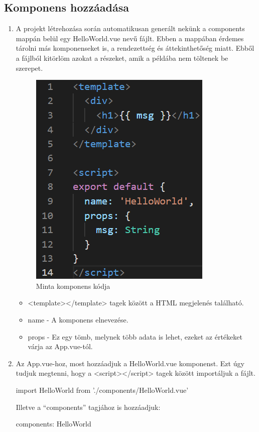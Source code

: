 \subsection{Komponens hozzáadása}
\begin{enumerate}
	\item A projekt létrehozása során automatikusan generált nekünk a components mappán belül egy HelloWorld.vue nevű fájlt. Ebben a mappában érdemes tárolni más komponenseket is, a rendezettség és áttekinthetőség miatt. Ebből a fájlból kitörlöm azokat a részeket, amik a példába nem töltenek be szerepet. 
	\begin{figure}[h!]
	\centering
	\includegraphics[scale=0.25]{images/14dfb7fd47c01c0cd6d8692ca740c349.png}
	\caption{Minta komponens kódja}
	\label{fig:ff}
	\end{figure}
	\begin{itemize}
		\item <template></template> tagek között a HTML megjelenés található.
		\item name - A komponens elnevezése.
		\item props - Ez egy tömb, melynek több adata is lehet, ezeket az értékeket várja az App.vue-tól.
	\end{itemize}
	\item Az App.vue-hoz, most hozzáadjuk a HelloWorld.vue komponenst. Ezt úgy tudjuk megtenni, hogy a <script></script> tagek között importáljuk a fájlt.
	\begin{javascript}
import HelloWorld from './components/HelloWorld.vue'
\end{javascript}
	Illetve a “components” tagjához is hozzáadjuk:
\begin{javascript}
components: {
  HelloWorld
}
	\end{javascript}


\end{enumerate}
